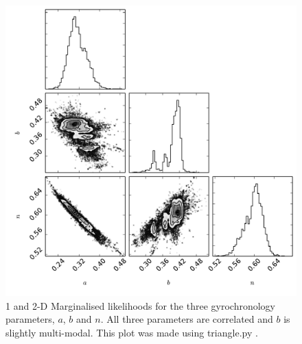 \documentclass[11pt,preprint]{aastex}
\begin{document}
\begin{figure}[ht]
\begin{center}
\includegraphics[width=6in, clip=false, trim=0 0 0.5in 0]{small_triangleACHF45.pdf}
\caption{1 and 2-D Marginalised likelihoods for the three gyrochronology
parameters, $a$, $b$ and $n$. All three parameters are correlated and $b$ is
slightly multi-modal. This plot was made using triangle.py
\citep{Foreman-Mackey_triangle}.
\label{fig:triangle}}
\end{center}
\end{figure}
\end{document}
